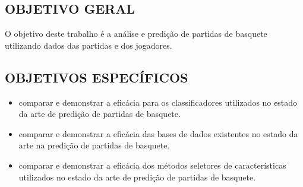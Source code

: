 \subsection{OBJETIVO GERAL}
O objetivo deste trabalho é a análise e predição de partidas de basquete utilizando dados das partidas e dos jogadores.

\subsection{OBJETIVOS ESPECÍFICOS}
\begin{itemize}
	\item comparar e demonstrar a eficácia para os classificadores utilizados no estado da arte de predição de partidas de basquete.
	\item comparar e demonstrar a eficácia das bases de dados existentes no estado da arte na predição de partidas de basquete.
	\item comparar e demonstrar a eficácia dos métodos seletores de características utilizados no estado da arte de predição de partidas de basquete.
\end{itemize}
